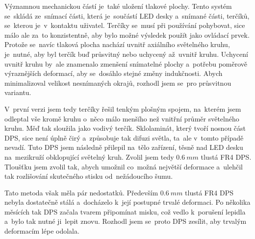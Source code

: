 Významnou mechanickou částí je~také uložení tlakové plochy.
Tento systém se~skládá ze~snímací části, která je~součástí LED desky a~snímané části, terčíků, se~kterou je~v~kontaktu uživatel.
Terčíky se~musí při používání pohybovat, sice málo ale za~to konzistentně, aby bylo možné výsledek použít jako ovládací prvek.
Protože se~navíc tlaková plocha nachází uvnitř axiálního světelného kruhu, je~nutné, aby byl terčík buď průsvitný nebo uchycený až~uvnitř kruhu.
Uchycení uvnitř kruhu by~ale znamenalo zmenšení snímatelné plochy a~potřebu poměrově výraznějších deformací, aby se~dosáhlo stejné změny indukčnosti.
Abych minimalizoval velikost nesnímaných okrajů, rozhodl jsem se~pro průsvitnou variantu.

V~první verzi jsem tedy terčíky řešil tenkým plošným spojem, na~kterém jsem odleptal vše kromě kruhu o~něco málo menšího než vnitřní průměr světelného kruhu.
Měď tak sloužila jako vodivý terčík.
Sklolaminát, který tvoří nosnou část DPS, sice není úplně čirý a~způsobuje tak difuzi světla, ta~ale v~tomto případě nevadí.
Tuto DPS jsem následně přilepil na~tělo zařízení, těsně nad LED desku na~mezikruží obklopující světelný kruh.
Zvolil jsem tedy \(0.6~mm\) tlustá FR4 DPS.
Tloušťku jsem zvolil tak, abych umožnil co~možná největší deformace a~ulehčil tak rozlišování skutečného stisku od~nežádoucího šumu.

Tato metoda však měla pár nedostatků.
Především \(0.6~mm\) tlustá FR4 DPS nebyla dostatečně stálá a~docházelo k~její postupné trvalé deformaci.
Po několika měsících tak DPS začala tvarem připomínat misku, což vedlo k~porušení lepidla a~bylo tak nutné ji~lepit znovu.
Rozhodl jsem se~proto DPS zesílit, aby trvalým deformacím lépe odolala.




